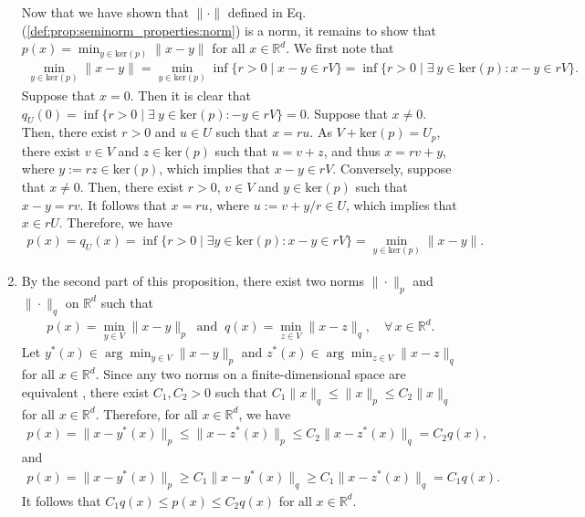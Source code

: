 \documentclass[11 pt]{article}
\begin{document}
\begin{enumerate}[(1)]
		
		Now that we have shown that $\| \cdot \|$ defined in Eq. (\ref{def:prop:seminorm_properties:norm}) is a norm, it remains to show that $p(x) = \min_{y \in \text{ker}(p)} \| x - y \|$ for all $x \in \mathbb{R}^d$. We first note that
		\begin{align*}
			\min_{y \in \text{ker}(p)} \| x - y \|
			= \min_{y \in \text{ker}(p)} \inf\{r > 0\mid x-y \in r V\} = \inf\{r > 0 \mid \exists~ y \in \text{ker}(p): x-y \in r V \}.
		\end{align*}
		Suppose that $x = 0$. Then it is clear  that $q_U(0) = \inf\{r > 0\mid \exists~ y \in \text{ker}(p): -y \in r V \} = 0$. Suppose that $x \not = 0$. Then, there exist $r > 0$ and $u \in U$ such that $x = r u$. As $V + \text{ker}(p) = U_p$, there exist $v \in V$ and $z \in \text{ker}(p)$ such that $u = v + z$, and thus $x = rv + y$, where $y := rz \in \text{ker}(p)$, which implies that $x-y \in rV$. Conversely, suppose that $x\not = 0$. Then, there exist $r> 0$, $v \in V$ and $y \in \text{ker}(p)$ such that $x-y=rv$. It follows that $x = r u$, where $u:= v + y/r \in U$, which implies that $x \in rU$. Therefore, we have
		\begin{align*}
			p(x) = q_{U}(x)
			= \inf\{r > 0\mid \exists y \in \text{ker}(p): x-y \in r V \} = \min_{y \in \text{ker}(p)} \| x - y \|.
		\end{align*}
		\item By the second part of this proposition, there exist two norms $\| \cdot \|_p$ and $\| \cdot \|_q$ on $\mathbb{R}^d$ such that
		\begin{align*}
			p(x) = \min_{y \in V} \| x - y \|_p ~\text{ and }~ q(x) = \min_{z \in V} \| x - z \|_q, \quad \forall\, x \in \mathbb{R}^d.
		\end{align*}
		Let $y^*(x) \in \arg \min_{y \in V} \| x - y \|_p$ and $z^*(x) \in \arg \min_{z \in V} \| x - z \|_q$ for all $x \in \mathbb{R}^d$. Since any two norms on a finite-dimensional space are equivalent \cite{halmos2017finite}, there exist $C_1,C_2>0$ such that $C_1\| x \|_q \leq \| x \|_p \leq C_2 \| x \|_q$ for all $x\in\mathbb{R}^d$. Therefore, for all $x \in \mathbb{R}^d$, we have
		\begin{align*}
			p(x) = \| x - y^*(x) \|_p \leq \| x - z^*(x) \|_p \leq C_2 \| x - z^*(x) \|_q = C_2 q(x),
		\end{align*}
		and
		\begin{align*}
			p(x) = \| x - y^*(x) \|_p \geq C_1 \| x - y^*(x) \|_q \geq C_1 \| x - z^*(x) \|_q = C_1 q(x).
		\end{align*}
		It follows that $C_1 q(x) \leq p(x)  \leq C_2 q(x)$ for all $x\in\mathbb{R}^d$.
	\end{enumerate}
	
\end{document}
